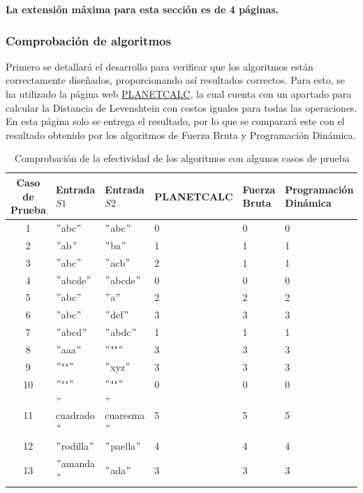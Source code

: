 \textbf{La extensión máxima para esta sección es de 4 páginas.}

\subsubsection{Comprobación de algoritmos}
Primero se detallará el desarrollo para verificar que los algoritmos están correctamente diseñados, proporcionando así resultados correctos. Para esto, se ha utilizado la página web \href{https://es.planetcalc.com/1721/}{PLANETCALC}, la cual cuenta con un apartado para calcular la Distancia de Levenshtein con costos iguales para todas las operaciones. En esta página solo se entrega el resultado, por lo que se comparará este con el resultado obtenido por los algoritmos de Fuerza Bruta y Programación Dinámica.

\begin{table}[H]
    \centering
    \footnotesize
    \begin{tabular}{|c|l|l|l|l|l|}
    \hline
    \textbf{Caso de Prueba} & \textbf{Entrada \( S1 \)} & \textbf{Entrada \( S2 \)} & \textbf{PLANETCALC} & \textbf{Fuerza Bruta} & \textbf{Programación Dinámica} \\
    \hline
    1 & $"$abc$"$ & $"$abc$"$ & 0 & 0 & 0 \\
    2 & $"$ab$"$ & $"$ba$"$ & 1 & 1 & 1 \\
    3 & $"$abc$"$ & $"$acb$"$ & 2 & 1 & 1 \\
    4 & $"$abcde$"$ & $"$abcde$"$ & 0 & 0 & 0 \\
    5 & $"$abc$"$ & $"$a$"$ & 2 & 2 & 2 \\
    6 & $"$abc$"$ & $"$def$"$ & 3 & 3 & 3 \\
    7 & $"$abcd$"$ & $"$abdc$"$ & 1 & 1 & 1 \\
    8 & $"$aaa$"$ & $"$""$"$ & 3 & 3 & 3 \\
    9 & $"$""$"$ & $"$xyz$"$ & 3 & 3 & 3 \\
    10 & $"$""$"$ & $"$""$"$ & 0 & 0 & 0 \\
    11 & $"$cuadrado$"$ & $"$cuaresma$"$ & 5 & 5 & 5 \\
    12 & $"$rodilla$"$ & $"$paella$"$ & 4 & 4 & 4 \\
    13 & $"$amanda$"$ & $"$ada$"$ & 3 & 3 & 3 \\
    \hline
    \end{tabular}
    \caption{Comprobación de la efectividad de los algoritmos con algunos casos de prueba}
    \label{fig:comparacion}
\end{table}

